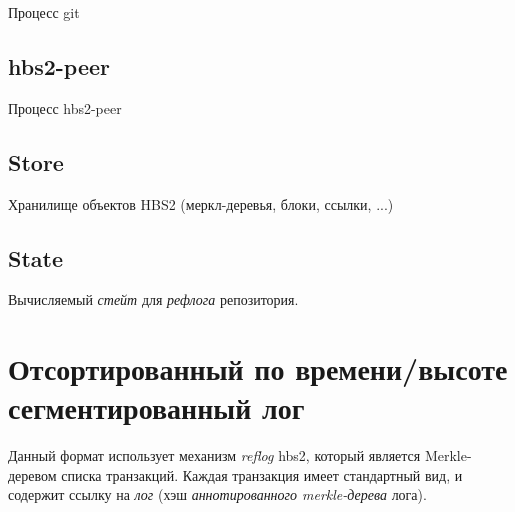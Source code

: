 \documentclass[11pt,a4paper]{article}
\newcommand{\term}[2]{\textit{#2}}
\begin{document}
Процесс git

\subsection*{hbs2-peer}

Процесс hbs2-peer

\subsection*{Store}

Хранилище объектов HBS2 (меркл-деревья, блоки, ссылки, ...)

\subsection*{State}

Вычисляемый \term{state}{стейт} для \term{reflog}{рефлога} репозитория.

\section{Отсортированный по времени/высоте сегментированный лог}

\begin{figure}[h!]
\centering
\end{figure}

Данный формат использует механизм \term{reflog}{reflog} hbs2, который является Merkle-деревом
списка транзакций. Каждая транзакция имеет стандартный вид, и содержит ссылку на
\term{log}{лог} (хэш \term{ann-merkle-tree}{аннотированного merkle-дерева} лога).
\end{document}
